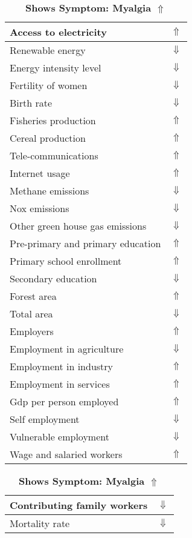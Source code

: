 \documentclass[12pt,notitlepage,oneside]{report}
\begin{document}
\begin{table}[!htb]
\caption{\textbf{Shows Symptom: Myalgia $\Uparrow$}}
\centering
\label{Correlated Socio-economic Factors0}
\begin{tabular}{|l|l|}
\hline
Access to electricity & $\Uparrow$\\ \hline
Renewable energy & $\Downarrow$\\ \hline
Energy intensity level & $\Downarrow$\\ \hline
Fertility of women & $\Downarrow$\\ \hline
Birth rate & $\Downarrow$\\ \hline
Fisheries production & $\Uparrow$\\ \hline
Cereal production & $\Uparrow$\\ \hline
Tele-communications & $\Uparrow$\\ \hline
Internet usage & $\Uparrow$\\ \hline
Methane emissions & $\Downarrow$\\ \hline
Nox emissions & $\Downarrow$\\ \hline
Other green house gas emissions & $\Downarrow$\\ \hline
Pre-primary and primary education & $\Uparrow$\\ \hline
Primary school enrollment & $\Uparrow$\\ \hline
Secondary education & $\Downarrow$\\ \hline
Forest area & $\Uparrow$\\ \hline
Total area & $\Downarrow$\\ \hline
Employers & $\Uparrow$\\ \hline
Employment in agriculture & $\Downarrow$\\ \hline
Employment in industry & $\Uparrow$\\ \hline
Employment in services & $\Uparrow$\\ \hline
Gdp per person employed & $\Uparrow$\\ \hline
Self employment & $\Downarrow$\\ \hline
Vulnerable employment & $\Downarrow$\\ \hline
Wage and salaried workers & $\Uparrow$\\ \hline
\end{tabular}
\begin{tabular}{|l|l|}
\hline
Contributing family workers & $\Downarrow$\\ \hline
Mortality rate & $\Downarrow$\\ \hline

\end{tabular}
\end{table}
\end{document}
